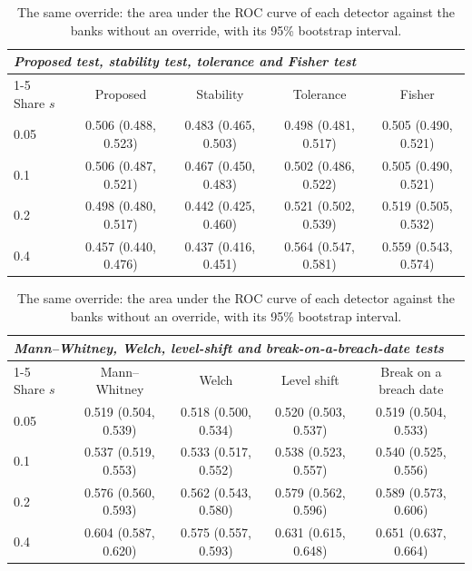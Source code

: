 \begin{table}[htbp]
\centering
\footnotesize
\caption{The same override: the area under the ROC curve of each detector against the banks without an override, with its 95\% bootstrap interval.}
\label{tab:weight-override-auc}
\begin{tabular}{lcccc}
\toprule
\multicolumn{5}{l}{\textit{Proposed test, stability test, tolerance and Fisher test}} \\
\cmidrule(lr){1-5}
Share $s$ & Proposed & Stability & Tolerance & Fisher \\
\midrule
0.05 & 0.506 (0.488, 0.523) & 0.483 (0.465, 0.503) & 0.498 (0.481, 0.517) & 0.505 (0.490, 0.521) \\
0.1 & 0.506 (0.487, 0.521) & 0.467 (0.450, 0.483) & 0.502 (0.486, 0.522) & 0.505 (0.490, 0.521) \\
0.2 & 0.498 (0.480, 0.517) & 0.442 (0.425, 0.460) & 0.521 (0.502, 0.539) & 0.519 (0.505, 0.532) \\
0.4 & 0.457 (0.440, 0.476) & 0.437 (0.416, 0.451) & 0.564 (0.547, 0.581) & 0.559 (0.543, 0.574) \\
\bottomrule
\end{tabular}
\par\medskip
\begin{tabular}{lcccc}
\toprule
\multicolumn{5}{l}{\textit{Mann--Whitney, Welch, level-shift and break-on-a-breach-date tests}} \\
\cmidrule(lr){1-5}
Share $s$ & Mann--Whitney & Welch & Level shift & Break on a breach date \\
\midrule
0.05 & 0.519 (0.504, 0.539) & 0.518 (0.500, 0.534) & 0.520 (0.503, 0.537) & 0.519 (0.504, 0.533) \\
0.1 & 0.537 (0.519, 0.553) & 0.533 (0.517, 0.552) & 0.538 (0.523, 0.557) & 0.540 (0.525, 0.556) \\
0.2 & 0.576 (0.560, 0.593) & 0.562 (0.543, 0.580) & 0.579 (0.562, 0.596) & 0.589 (0.573, 0.606) \\
0.4 & 0.604 (0.587, 0.620) & 0.575 (0.557, 0.593) & 0.631 (0.615, 0.648) & 0.651 (0.637, 0.664) \\
\bottomrule
\end{tabular}
\end{table}
